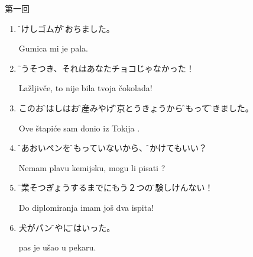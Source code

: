 \documentclass[intermediate]{grampig}
\begin{document}
	{\Large {} \hfill 第一回} \vspace{1em}
	
	\begin{enumerate}
		\item \parbox[t]{\linewidth}{\f{消}{け}しゴムが\f{落}{お}ちました。}
		\bh\strut
		Gumica mi je  pala.
		
		\item \f{嘘}{うそ}つき、それはあなたチョコじゃなかった！
		\bh\strut
		Lažljivče, to nije bila  tvoja čokolada!
		
		\item このお\f{箸}{はし}はお\f{土産}{みやげ}\f{東京}{とうきょう}から\f{持}{も}って\f{来}{き}ました。
		\bh\strut
		Ove štapiće sam donio iz Tokija .
		
		\item \f{青}{あお}いペンを\f{持}{も}っていないから、\f{書}{か}けてもいい？
		\bh\strut
		Nemam plavu kemijsku, mogu li pisati ?
		
		\item \f{卒業}{そつぎょう}するまでにもう２つの\f{試験}{しけん}ない！
		\bh\strut
		Do diplomiranja imam još  dva ispita!
		
		\item {}犬がパン\f{屋}{や}に\f{入}{はい}った。
		\bh\strut
		 pas je ušao u pekaru.
		
	\end{enumerate}
\end{document}
